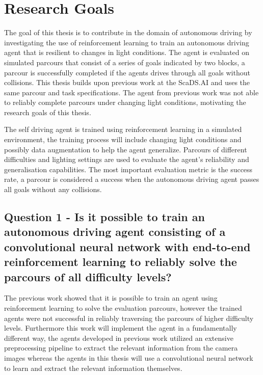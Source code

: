 \chapter{Research Goals}
\label{cha:Research Goals}

The goal of this thesis is to contribute in the domain of autonomous driving by investigating the use of reinforcement learning to train an autonomous driving agent that is resilient to changes in light conditions. The agent is evaluated on  simulated parcours that consist of a series of goals indicated by two blocks, a parcour is successfully completed if the agents drives through all goals without collisions.
This thesis builds upon previous work at the ScaDS.AI \autocite{maximilian} and uses the same parcour and task specifications. The agent from previous work was not able to reliably complete parcours under changing light conditions, motivating the research goals of this thesis.


The self driving agent is trained using reinforcement learning in a simulated environment, the training process will include changing light conditions and possibly data augmentation to help the agent generalize.
Parcours of different difficulties and lighting settings are used to evaluate the agent's reliability and generalisation capabilities. The most important evaluation metric is the success rate, a parcour is considered a success when the autonomous driving agent passes all goals without any collisions.


\section{Question 1 - Is it possible to train an autonomous driving agent consisting of a convolutional neural network with end-to-end reinforcement learning to reliably solve the parcours of all difficulty levels?}

The previous work \autocite{maximilian} showed that it is possible to train an agent using reinforcement learning to solve the evaluation parcours, however the trained agents were not successful in reliably traversing the parcours of higher difficulty levels. Furthermore this work will implement the agent in a fundamentally different way, the agents developed in previous work utilized an extensive preprocessing pipeline to extract the relevant information from the camera images whereas the agents in this thesis will use a convolutional neural network to learn and extract the relevant information themselves.

